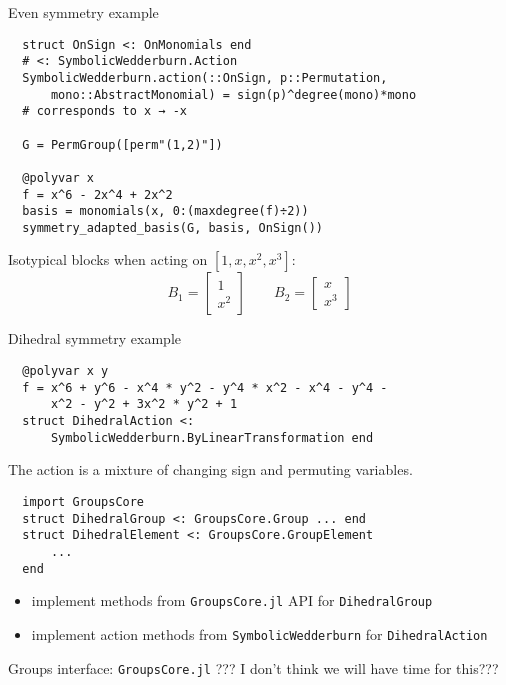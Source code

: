 \begin{frame}[fragile]{Even symmetry example}
\footnotesize
\begin{verbatim}
  struct OnSign <: OnMonomials end
  # <: SymbolicWedderburn.Action
  SymbolicWedderburn.action(::OnSign, p::Permutation, 
      mono::AbstractMonomial) = sign(p)^degree(mono)*mono
  # corresponds to x → -x
  
  G = PermGroup([perm"(1,2)"])
  
  @polyvar x
  f = x^6 - 2x^4 + 2x^2
  basis = monomials(x, 0:(maxdegree(f)÷2))
  symmetry_adapted_basis(G, basis, OnSign())  
\end{verbatim}

  Isotypical blocks when acting on $[1, x, x^2, x^3]$:
\[
  B_1 = \begin{bmatrix}
          1\\
          x^2
        \end{bmatrix}
  \qquad
  B_2 = \begin{bmatrix}
          x\\
          x^3
        \end{bmatrix}
\]

\end{frame}

\begin{frame}[fragile]{Dihedral symmetry example}
\footnotesize
  \begin{verbatim}
  @polyvar x y
  f = x^6 + y^6 - x^4 * y^2 - y^4 * x^2 - x^4 - y^4 - 
      x^2 - y^2 + 3x^2 * y^2 + 1
  struct DihedralAction <: 
      SymbolicWedderburn.ByLinearTransformation end
  \end{verbatim}
  The action is a mixture of changing sign and permuting variables.
  \begin{verbatim}
  import GroupsCore
  struct DihedralGroup <: GroupsCore.Group ... end
  struct DihedralElement <: GroupsCore.GroupElement
      ...
  end
  \end{verbatim}
  \begin{itemize}
    \item implement methods from \texttt{GroupsCore.jl} API for \texttt{DihedralGroup}
    \item implement action methods from \texttt{SymbolicWedderburn} for \texttt{DihedralAction}
  \end{itemize}


\end{frame}

\begin{frame}{Groups interface: \texttt{GroupsCore.jl}}
  ??? I don't think we will have time for this???
\end{frame}

